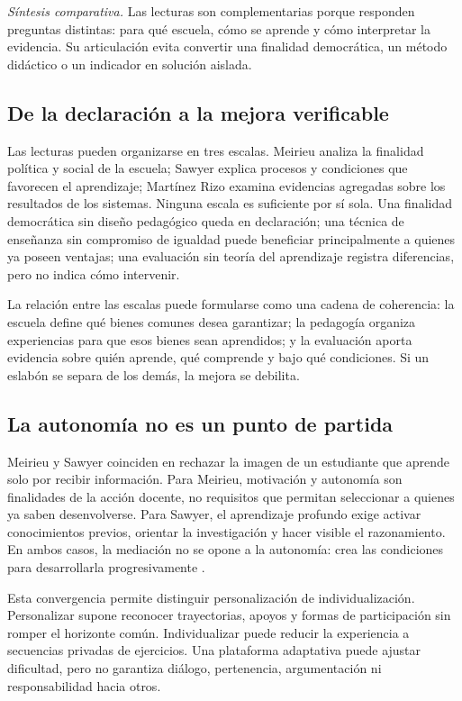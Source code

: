 \documentclass[spanish,letterpaper,oneside]{article}
\begin{document}
\noindent\textit{Síntesis comparativa.} Las lecturas son complementarias porque responden preguntas distintas: para qué escuela, cómo se aprende y cómo interpretar la evidencia. Su articulación evita convertir una finalidad democrática, un método didáctico o un indicador en solución aislada.

\subsection{De la declaración a la mejora verificable}

Las lecturas pueden organizarse en tres escalas. Meirieu analiza la finalidad política y social de la escuela; Sawyer explica procesos y condiciones que favorecen el aprendizaje; Martínez Rizo examina evidencias agregadas sobre los resultados de los sistemas. Ninguna escala es suficiente por sí sola. Una finalidad democrática sin diseño pedagógico queda en declaración; una técnica de enseñanza sin compromiso de igualdad puede beneficiar principalmente a quienes ya poseen ventajas; una evaluación sin teoría del aprendizaje registra diferencias, pero no indica cómo intervenir.

La relación entre las escalas puede formularse como una cadena de coherencia: la escuela define qué bienes comunes desea garantizar; la pedagogía organiza experiencias para que esos bienes sean aprendidos; y la evaluación aporta evidencia sobre quién aprende, qué comprende y bajo qué condiciones. Si un eslabón se separa de los demás, la mejora se debilita.

\subsection{La autonomía no es un punto de partida}

Meirieu y Sawyer coinciden en rechazar la imagen de un estudiante que aprende solo por recibir información. Para Meirieu, motivación y autonomía son finalidades de la acción docente, no requisitos que permitan seleccionar a quienes ya saben desenvolverse. Para Sawyer, el aprendizaje profundo exige activar conocimientos previos, orientar la investigación y hacer visible el razonamiento. En ambos casos, la mediación no se opone a la autonomía: crea las condiciones para desarrollarla progresivamente \citep{meirieu2020escuela,sawyer2008optimizing}.

Esta convergencia permite distinguir personalización de individualización. Personalizar supone reconocer trayectorias, apoyos y formas de participación sin romper el horizonte común. Individualizar puede reducir la experiencia a secuencias privadas de ejercicios. Una plataforma adaptativa puede ajustar dificultad, pero no garantiza diálogo, pertenencia, argumentación ni responsabilidad hacia otros.
\end{document}

